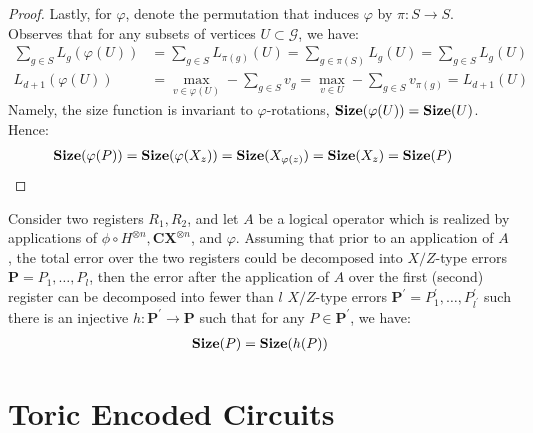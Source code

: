 \begin{proof}
Lastly, for $\varphi$, denote the permutation that induces $\varphi$ by $\pi : S \rightarrow S$. Observes that for any subsets of vertices $U\subset \mathcal{G}$, we have:   
\begin{equation*}
  \begin{split}
    \sum_{g \in S}L_{g}(\varphi(U) )  &= \sum_{g \in S}L_{\pi(g)}(U ) = \sum_{g \in \pi(S)}L_{g}(U ) =\sum_{g \in S}L_{g}(U ) \\
    L_{d+1}(\varphi(U) ) &= \max_{v \in \varphi(U) } - \sum_{g \in S} v_{g} = \max_{v \in U } - \sum_{g \in S} v_{\pi(g)} = L_{d+1}(U)
  \end{split}
\end{equation*}
Namely, the size function is invariant to $\varphi$-rotations, $\mathbf{Size}(\varphi(U)) = \mathbf{Size}(U)$. Hence:
\begin{equation*}
  \begin{split}
    \mathbf{Size}( \varphi (P) ) &= \mathbf{Size}( \varphi (X_{z}) ) = \mathbf{Size}( X_{\varphi(z)} ) = \mathbf{Size}( X_{z} ) = \mathbf{Size}( P )
  \end{split}
\end{equation*}
\end{proof}

\begin{corollary}
Consider two registers $R_{1}, R_{2}$, and let $A$ be a logical operator which is realized by applications of $\phi \circ H^{\otimes n}, \mathbf{CX}^{\otimes n}$, and $\varphi$. Assuming that prior to an application of $A$, the total error over the two registers could be decomposed into $X/Z$-type errors $\mathbf{P} = P_{1}, \ldots, P_{l}$, then the error after the application of $A$ over the first (second) register can be decomposed into fewer than $l$ $X/Z$-type errors $\mathbf{P^{\prime}} = P^{\prime}_{1}, \ldots, P^{\prime}_{l^{\prime}}$ such there is an injective $h : \mathbf{P^{\prime}} \rightarrow \mathbf{P}$ such that for any $P \in \mathbf{P^{\prime}}$, we have:
  \begin{equation*}
    \begin{split}
      \mathbf{Size}(P) = \mathbf{Size}( h(P) )
    \end{split}
  \end{equation*}
\end{corollary}


\section{Toric Encoded Circuits}

